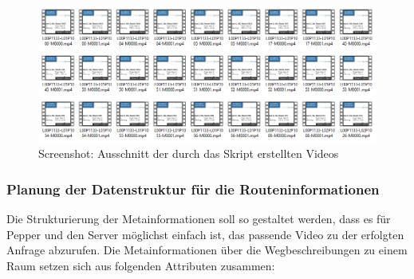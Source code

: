 \begin{figure}[H]
    \includegraphics[width=\textwidth]{Figures/3DNavigator/videos.png}
    \caption{Screenshot: Ausschnitt der durch das Skript erstellten Videos}
    \label{fig:integration}
    \centering
\end{figure}\vspace{-2.5mm}

\subsubsection{Planung der Datenstruktur für die Routeninformationen}

Die Strukturierung der Metainformationen soll so gestaltet werden, dass es für Pepper und den Server möglichst einfach ist, das passende Video zu der erfolgten Anfrage abzurufen. Die Metainformationen über die Wegbeschreibungen zu einem Raum setzen sich aus folgenden Attributen zusammen:\vspace{5mm}

